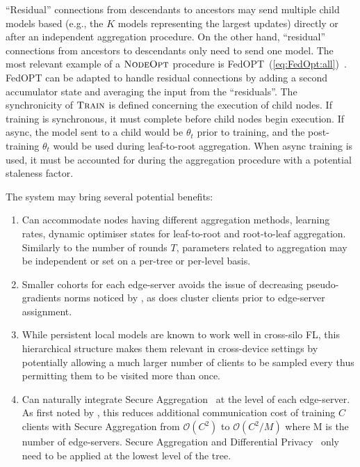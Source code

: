 ``Residual'' connections from descendants to ancestors may send multiple child models based (e.g., the $K$ models representing the largest updates) directly or after an independent aggregation procedure. On the other hand, ``residual'' connections from ancestors to descendants only need to send one model. The most relevant example of a $\textsc{NodeOpt}$ procedure is FedOPT~(\cref{eq:FedOpt:all})~\citep{FedOPT}. FedOPT can be adapted to handle residual connections by adding a second accumulator state and averaging the input from the ``residuals''. The synchronicity of $\textsc{Train}$ is defined concerning the execution of child nodes. If training is synchronous, it must complete before child nodes begin execution. If async, the model sent to a child would be $\theta_t$ prior to training, and the post-training $\theta_t$ would be used during leaf-to-root aggregation. When async training is used, it must be accounted for during the aggregation procedure with a potential staleness factor.

The system may bring several potential benefits:
\begin{enumerate}
    \item Can accommodate nodes having different aggregation methods, learning rates, dynamic optimiser states for leaf-to-root and root-to-leaf aggregation. Similarly to the number of rounds $T$, parameters related to aggregation may be independent or set on a per-tree or per-level basis.
    \item Smaller cohorts for each edge-server avoids the issue of decreasing pseudo-gradients norms noticed by \citet{LargeCohorts}, as does cluster clients prior to edge-server assignment.
    \item While persistent local models are known to work well in cross-silo FL, this hierarchical structure makes them relevant in cross-device settings by potentially allowing a much larger number of clients to be sampled every thus permitting them to be visited more than once.
    \item Can naturally integrate Secure Aggregation~\citep{SecAggOG,FastSecAgg} at the level of each edge-server. As first noted by \citet{ScaleSystemDesign}, this reduces additional communication cost of training $C$ clients with Secure Aggregation from $\mathcal{O}(C^2)$ to $\mathcal{O}(C^2/M)$ where M is the number of edge-servers. Secure Aggregation and Differential Privacy~\citep{DiffPrivacyFL} only need to be applied at the lowest level of the tree.

\end{enumerate}


